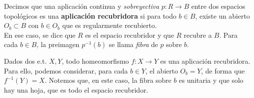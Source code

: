 \begin{definicion}
    Decimos que una aplicación continua y \emph{sobreyectiva} $p:R \to B$ entre dos espacios topológicos es una \textbf{aplicación recubridora} si para todo $b \in B$, existe un abierto $O_b\subset B$ con $b\in O_b$ que es regularmente recubierto.\\

    En ese caso, se dice que $R$ es el espacio recubridor y que $R$ recubre a $B$. Para cada $b\in B$, la preimagen $p^{-1}(b)$ se llama \emph{fibra} de $p$ sobre $b$.
\end{definicion}

\begin{observacion}
    Dados dos e.t. $X,Y$, todo homeomorfismo $f:X\to Y$ es una aplicación recubridora. Para ello, podemos considerar, para cada $b\in Y$, el abierto $O_b=Y$, de forma que $f^{-1}(Y)=X$. Notemos que, en este caso, la fibra sobre $b$ es unitaria y que solo hay una hoja, que es todo el espacio recubridor.
\end{observacion}

